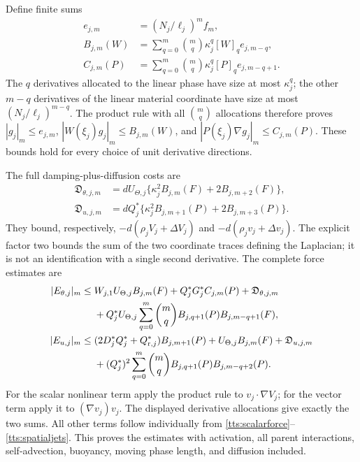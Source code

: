 Define finite sums
\begin{align}\label{tts:productbounds}
 e_{j,m}&=(N_j/\ell_j)^mf_m,\nonumber\\
 B_{j,m}(W)&=\sum_{q=0}^m\binom mq
                      \kappa_j^q[W]_qe_{j,m-q},\\
 C_{j,m}(P)&=\sum_{q=0}^m\binom mq
                      \kappa_j^q[P]_qe_{j,m-q+1}.\nonumber
\end{align}
The $q$ derivatives allocated to the linear phase have size at
most $\kappa_j^q$; the other $m-q$ derivatives of the linear
material coordinate have size at most $(N_j/\ell_j)^{m-q}$.
The product rule with all $\binom mq$ allocations therefore proves
$|g_j|_m\leq e_{j,m}$,
$|W(\xi_j)g_j|_m\leq B_{j,m}(W)$, and
$|P(\xi_j)\nabla g_j|_m\leq C_{j,m}(P)$.
These bounds hold for every choice of unit derivative directions.

The full damping-plus-diffusion costs are
\begin{align}\label{tts:diffusionnorms}
 \mathfrak D_{\theta,j,m}
 &=dU_{\Theta,j}
       \{\kappa_j^2B_{j,m}(F)+2B_{j,m+2}(F)\},\nonumber\\
 \mathfrak D_{u,j,m}
 &=dQ_j^*
       \{\kappa_j^2B_{j,m+1}(P)+2B_{j,m+3}(P)\}.
\end{align}
They bound, respectively, $-d(\rho_jV_j+\Delta V_j)$ and
$-d(\rho_jv_j+\Delta v_j)$. The explicit factor two bounds
the sum of the two coordinate traces defining the Laplacian;
it is not an identification with a single second derivative.
The complete force estimates are
\begin{align}\label{tts:scalarcost}
 |E_{\theta,j}|_m\leq{}&W_{j,1}U_{\Theta,j}B_{j,m}(F)
  +Q_j^*G_j^*C_{j,m}(P)+\mathfrak D_{\theta,j,m}\nonumber\\
 &+Q_j^*U_{\Theta,j}
    \sum_{q=0}^m\binom mq B_{j,q+1}(P)B_{j,m-q+1}(F),\\
 |E_{u,j}|_m\leq{}&(2D_j^*Q_j^*+Q_{{\rm r},j}^*)B_{j,m+1}(P)
   +U_{\Theta,j}B_{j,m}(F)+\mathfrak D_{u,j,m}\nonumber\\
 &+(Q_j^*)^2\sum_{q=0}^m\binom mq
                    B_{j,q+1}(P)B_{j,m-q+2}(P).
 \label{tts:vectorcost}
\end{align}
For the scalar nonlinear term apply the product rule to
$v_j\cdot\nabla V_j$; for the vector term apply it to
$(\nabla v_j)v_j$. The displayed derivative allocations give
exactly the two sums. All other terms follow individually from
\eqref{tts:scalarforce}--\eqref{tts:spatialjets}. This proves
the estimates with activation, all parent interactions, self-advection,
buoyancy, moving phase length, and diffusion included.

